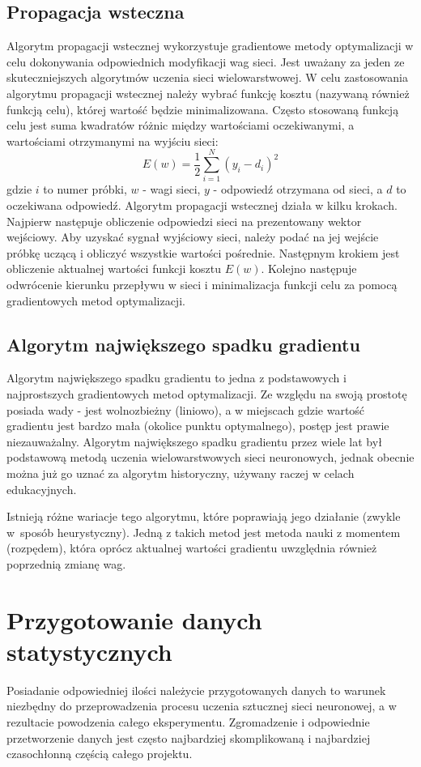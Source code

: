 \section{Propagacja wsteczna}
\label{Sec:ThBackprop}
Algorytm propagacji wstecznej wykorzystuje gradientowe metody optymalizacji w celu dokonywania odpowiednich modyfikacji wag sieci. Jest uważany za jeden ze skuteczniejszych algorytmów uczenia sieci wielowarstwowej.\cite{osow01} W celu zastosowania algorytmu propagacji wstecznej należy wybrać funkcję kosztu (nazywaną również funkcją celu), której wartość będzie minimalizowana. Często stosowaną funkcją celu jest suma kwadratów różnic między wartościami oczekiwanymi, a wartościami otrzymanymi na wyjściu sieci: $$ E(w)=\frac{1}{2}\sum_{i=1}^{N}(y_i-d_i)^2$$ gdzie $i$ to numer próbki, $w$ - wagi sieci, $y$ - odpowiedź otrzymana od sieci, a $d$ to oczekiwana odpowiedź. Algorytm propagacji wstecznej działa w kilku krokach. Najpierw następuje obliczenie odpowiedzi sieci na prezentowany wektor wejściowy. Aby uzyskać sygnał wyjściowy sieci, należy podać na jej wejście próbkę uczącą i obliczyć wszystkie wartości pośrednie. Następnym krokiem jest obliczenie aktualnej wartości funkcji kosztu $E(w)$. Kolejno następuje odwrócenie kierunku przepływu w sieci i minimalizacja funkcji celu za pomocą gradientowych metod optymalizacji.


\section{Algorytm największego spadku gradientu}
\label{Sec:ThGrad}
Algorytm największego spadku gradientu to jedna z podstawowych i najprostszych gradientowych metod optymalizacji. Ze względu na swoją prostotę posiada wady - jest wolnozbieżny (liniowo), a w miejscach gdzie wartość gradientu jest bardzo mała (okolice punktu optymalnego), postęp jest prawie niezauważalny. Algorytm największego spadku gradientu przez wiele lat był podstawową metodą uczenia wielowarstwowych sieci neuronowych\cite{osow01}, jednak obecnie można już go uznać za algorytm historyczny, używany raczej w celach edukacyjnych.

Istnieją różne wariacje tego algorytmu, które poprawiają jego działanie (zwykle w~sposób heurystyczny). Jedną z takich metod jest metoda nauki z momentem (rozpędem), która oprócz aktualnej wartości gradientu uwzględnia również poprzednią zmianę wag.

\chapter{Przygotowanie danych statystycznych}
Posiadanie odpowiedniej ilości należycie przygotowanych danych to warunek niezbędny do przeprowadzenia procesu uczenia sztucznej sieci neuronowej, a w rezultacie powodzenia całego eksperymentu. Zgromadzenie i odpowiednie przetworzenie danych jest często najbardziej skomplikowaną i najbardziej czasochłonną częścią całego projektu. 

